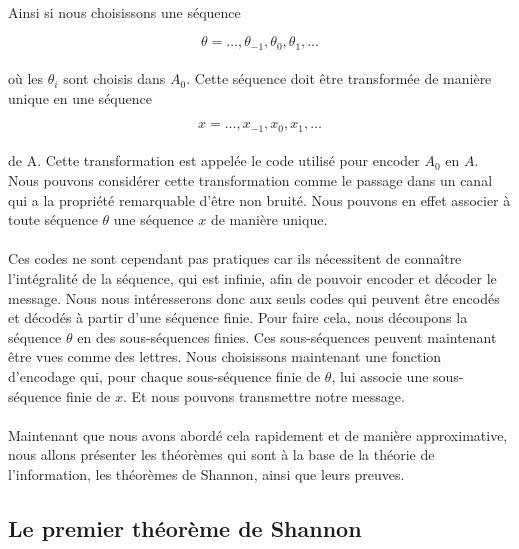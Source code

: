 	\paragraph{}
	Ainsi si nous choisissons une séquence

	\[\theta = \dots,\theta_{-1},\theta_{0},\theta_{1},\dots\]

	\paragraph{}
	où les $\theta_i$ sont choisis dans $A_0$. Cette séquence doit être transformée de manière unique en une séquence

	\[x = \dots,x_{-1},x_{0},x_{1},\dots\]

	\paragraph{}
	de A. Cette transformation est appelée le code utilisé pour encoder $A_0$ en $A$. Nous pouvons considérer cette 
	transformation comme le passage dans un canal qui a la propriété remarquable d'être non bruité.
	Nous pouvons en effet associer à toute séquence $\theta$ une séquence $x$ de manière unique. 

	\paragraph{}
	Ces codes ne sont cependant pas pratiques car ils nécessitent de connaître l'intégralité de la séquence, qui est 
	infinie, afin de pouvoir encoder et décoder le message. Nous  nous intéresserons donc aux seuls codes qui peuvent être encodés et 
	décodés à partir d'une séquence 
	finie. Pour faire cela, nous découpons la séquence $\theta$ en des sous-séquences finies. 
	Ces sous-séquences peuvent maintenant être vues comme des lettres. Nous choisissons maintenant une fonction d'encodage qui, pour 
	chaque sous-séquence finie de $\theta$, lui associe une sous-séquence finie de $x$. Et nous pouvons transmettre notre message.
	
	\paragraph{}
	Maintenant que nous avons abordé cela rapidement et de manière 
	approximative, nous allons présenter les théorèmes qui sont à la base
	de la théorie de l'information, les théorèmes
	de Shannon, ainsi que leurs preuves.

\subsection{Le premier théorème de Shannon}

